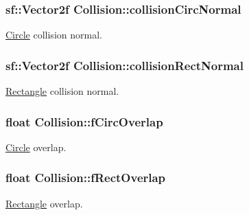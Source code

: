 \subsubsection[{\texorpdfstring{collision\+Circ\+Normal}{collisionCircNormal}}]{\setlength{\rightskip}{0pt plus 5cm}sf\+::\+Vector2f Collision\+::collision\+Circ\+Normal\hspace{0.3cm}{\ttfamily [private]}}\hypertarget{class_collision_aed4ea8e9cafeec9b67713c2948854ee4}{}\label{class_collision_aed4ea8e9cafeec9b67713c2948854ee4}
\hyperlink{class_circle}{Circle} collision normal. 
\subsubsection[{\texorpdfstring{collision\+Rect\+Normal}{collisionRectNormal}}]{\setlength{\rightskip}{0pt plus 5cm}sf\+::\+Vector2f Collision\+::collision\+Rect\+Normal\hspace{0.3cm}{\ttfamily [private]}}\hypertarget{class_collision_a1ccb2e8e575ead01b332a65338bc92fd}{}\label{class_collision_a1ccb2e8e575ead01b332a65338bc92fd}
\hyperlink{class_rectangle}{Rectangle} collision normal. 
\subsubsection[{\texorpdfstring{f\+Circ\+Overlap}{fCircOverlap}}]{\setlength{\rightskip}{0pt plus 5cm}float Collision\+::f\+Circ\+Overlap\hspace{0.3cm}{\ttfamily [private]}}\hypertarget{class_collision_a35cb18deca301a426db25a00eb2fd504}{}\label{class_collision_a35cb18deca301a426db25a00eb2fd504}
\hyperlink{class_circle}{Circle} overlap. 
\subsubsection[{\texorpdfstring{f\+Rect\+Overlap}{fRectOverlap}}]{\setlength{\rightskip}{0pt plus 5cm}float Collision\+::f\+Rect\+Overlap\hspace{0.3cm}{\ttfamily [private]}}\hypertarget{class_collision_a232bdb17411322d39be3dba8df18fe19}{}\label{class_collision_a232bdb17411322d39be3dba8df18fe19}
\hyperlink{class_rectangle}{Rectangle} overlap. 
